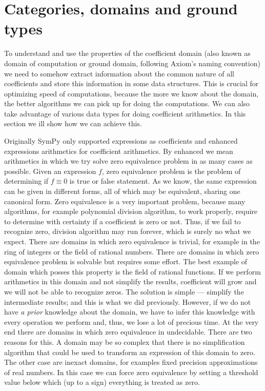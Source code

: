 \section{Categories, domains and ground types}\label{thesis-ground}

To understand and use the properties of the coefficient domain (also known as domain of computation
or ground domain, following Axiom's naming convention) we need to somehow extract information about
the common nature of all coefficients and store this information in some data structures. This is
crucial for optimizing speed of computations, because the more we know about the domain, the better
algorithms we can pick up for doing the computations. We can also take advantage of various data
types for doing coefficient arithmetics. In this section we ill show how we can achieve this.

Originally SymPy only supported expressions as coefficients and enhanced expressions arithmetics
for coefficient arithmetics. By enhanced we mean arithmetics in which we try solve zero equivalence
problem \cite{Richardson1997zero} in as many cases as possible. Given an expression $f$, zero equivalence
problem is the problem of determining if $f \equiv 0$ is true or false statement. As we know, the same
expression can be given in different forms, all of which may be equivalent, sharing one canonical form.
Zero equivalence is a very important problem, because many algorithms, for example polynomial division
algorithm, to work properly, require to determine with certainty if a coefficient is zero or not. Thus,
if we fail to recognize zero, division algorithm may run forever, which is surely no what we expect.
There are domains in which zero equivalence is trivial, for example in the ring of integers or the field
of rational numbers. There are domains in which zero equivalence problem is solvable but requires some
effort. The best example of domain which posses this property is the field of rational functions. If we
perform arithmetics in this domain and not simplify the results, coefficient will grow and we will not
be able to recognize zeros. The solution is simple --- simplify the intermediate results; and this is
what we did previously. However, if we do not have \emph{a prior} knowledge about the domain, we have to infer
this knowledge with every operation we perform and, thus, we lose a lot of precious time. At the very end
there are domains in which zero equivalence in undecidable. There are two reasons for this. A domain may
be so complex that there is no simplification algorithm that could be used to transform an expression of
this domain to zero. The other case are inexact domains, for examples fixed precision approximations of
real numbers. In this case we can force zero equivalence by setting a threshold value below which (up to
a sign) everything is treated as zero.

